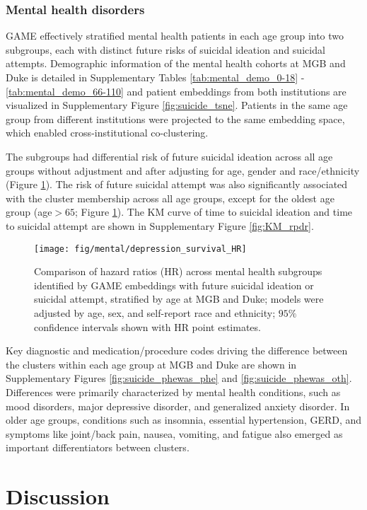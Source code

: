 \documentclass{article}
\begin{document}
\subsubsection{Mental health disorders}
GAME effectively stratified mental health patients in each age group into two subgroups, each with distinct future risks of suicidal ideation and suicidal attempts. Demographic information of the mental health cohorts at MGB and Duke is detailed in Supplementary Tables \ref{tab:mental_demo_0-18} - \ref{tab:mental_demo_66-110} and patient embeddings from both institutions are visualized in Supplementary Figure \ref{fig:suicide_tsne}. Patients in the same age group from different institutions were projected to the same embedding space, which enabled cross-institutional co-clustering. 

The subgroups had differential risk of future suicidal ideation across all age groups without adjustment and after adjusting for age, gender and race/ethnicity (Figure \ref{fig:suicide_HR}). The risk of future suicidal attempt was also significantly associated with the cluster membership across all age groups, except for the oldest age group (age$>65$; Figure \ref{fig:suicide_HR}). The KM curve of time to suicidal ideation and time to suicidal attempt are shown in Supplementary Figure \ref{fig:KM_rpdr}. 

\begin{figure}[!htbp]
    \centering
    \texttt{[image: fig/mental/depression\_survival\_HR]}
    \caption{Comparison of hazard ratios (HR) across mental health subgroups identified by GAME embeddings with future suicidal ideation or suicidal attempt, stratified by age at MGB and Duke; models were adjusted by age, sex, and self-report race and ethnicity; $95\%$ confidence intervals shown with HR point estimates.}
    \label{fig:suicide_HR}
\end{figure}


Key diagnostic and medication/procedure codes driving the difference between the clusters within each age group at MGB and Duke are shown in Supplementary Figures \ref{fig:suicide_phewas_phe} and \ref{fig:suicide_phewas_oth}. Differences were primarily characterized by mental health conditions, such as mood disorders, major depressive disorder, and generalized anxiety disorder. In older age groups, conditions such as insomnia, essential hypertension, GERD, and symptoms like joint/back pain, nausea, vomiting, and fatigue also emerged as important differentiators between clusters.

\section{Discussion}
\end{document}
